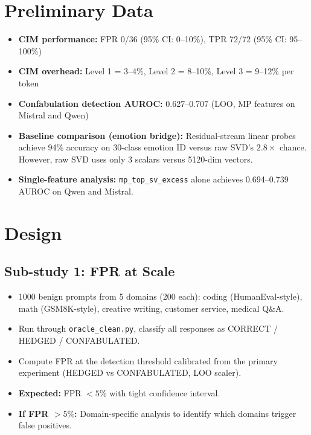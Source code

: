 \documentclass[11pt,letterpaper]{article}
\begin{document}
\section{Preliminary Data}

\begin{itemize}
  \item \textbf{CIM performance:} FPR 0/36 (95\% CI: 0--10\%), TPR 72/72
    (95\% CI: 95--100\%)
  \item \textbf{CIM overhead:} Level 1 = 3--4\%, Level 2 = 8--10\%, Level
    3 = 9--12\% per token
  \item \textbf{Confabulation detection AUROC:} 0.627--0.707 (LOO, MP
    features on Mistral and Qwen)
  \item \textbf{Baseline comparison (emotion bridge):} Residual-stream
    linear probes achieve 94\% accuracy on 30-class emotion ID versus raw
    SVD's $2.8\times$ chance. However, raw SVD uses only 3 scalars versus
    5120-dim vectors.
  \item \textbf{Single-feature analysis:} \texttt{mp\_top\_sv\_excess}
    alone achieves 0.694--0.739 AUROC on Qwen and Mistral.
\end{itemize}

\section{Design}

\subsection{Sub-study 1: FPR at Scale}

\begin{itemize}
  \item 1000 benign prompts from 5 domains (200 each): coding
    (HumanEval-style), math (GSM8K-style), creative writing, customer
    service, medical Q\&A.
  \item Run through \texttt{oracle\_clean.py}, classify all responses as
    CORRECT / HEDGED / CONFABULATED.
  \item Compute FPR at the detection threshold calibrated from the
    primary experiment (HEDGED vs CONFABULATED, LOO scaler).
  \item \textbf{Expected:} FPR $< 5\%$ with tight confidence interval.
  \item \textbf{If FPR $> 5\%$:} Domain-specific analysis to identify
    which domains trigger false positives.
\end{itemize}
\end{document}
